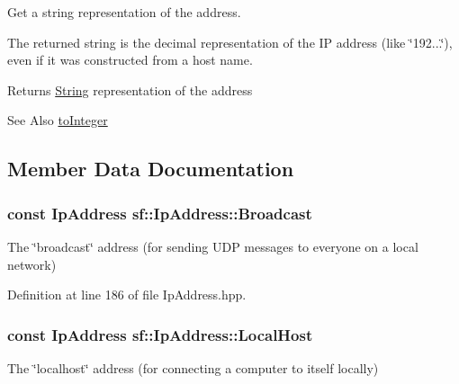Get a string representation of the address. 

The returned string is the decimal representation of the I\-P address (like \char`\"{}192...\char`\"{}), even if it was constructed from a host name.

\begin{DoxyReturn}{Returns}
\hyperlink{classsf_1_1_string}{String} representation of the address
\end{DoxyReturn}
\begin{DoxySeeAlso}{See Also}
\hyperlink{classsf_1_1_ip_address_af42678b08b23def2560aed7d98b24d89}{to\-Integer} 
\end{DoxySeeAlso}


\subsection{Member Data Documentation}
\hypertarget{classsf_1_1_ip_address_aa93d1d57b65d243f2baf804b6035465c}{
\subsubsection[{Broadcast}]{\setlength{\rightskip}{0pt plus 5cm}const {\bf Ip\-Address} sf\-::\-Ip\-Address\-::\-Broadcast\hspace{0.3cm}{\ttfamily [static]}}}\label{classsf_1_1_ip_address_aa93d1d57b65d243f2baf804b6035465c}


The \char`\"{}broadcast\char`\"{} address (for sending U\-D\-P messages to everyone on a local network) 



Definition at line 186 of file Ip\-Address.\-hpp.

\hypertarget{classsf_1_1_ip_address_a594d3a8e2559f8fa8ab0a96fa597333b}{
\subsubsection[{Local\-Host}]{\setlength{\rightskip}{0pt plus 5cm}const {\bf Ip\-Address} sf\-::\-Ip\-Address\-::\-Local\-Host\hspace{0.3cm}{\ttfamily [static]}}}\label{classsf_1_1_ip_address_a594d3a8e2559f8fa8ab0a96fa597333b}


The \char`\"{}localhost\char`\"{} address (for connecting a computer to itself locally) 



